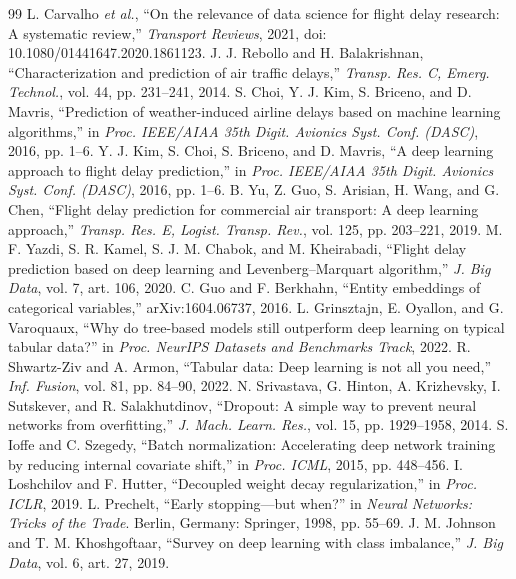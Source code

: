 \documentclass[conference]{IEEEtran}
\begin{document}
\begin{thebibliography}{99}
 L. Carvalho \emph{et al.}, ``On the relevance of data science for flight delay research: A systematic review,'' \emph{Transport Reviews}, 2021, doi: 10.1080/01441647.2020.1861123.
 J. J. Rebollo and H. Balakrishnan, ``Characterization and prediction of air traffic delays,'' \emph{Transp. Res. C, Emerg. Technol.}, vol. 44, pp. 231--241, 2014.
 S. Choi, Y. J. Kim, S. Briceno, and D. Mavris, ``Prediction of weather-induced airline delays based on machine learning algorithms,'' in \emph{Proc. IEEE/AIAA 35th Digit. Avionics Syst. Conf. (DASC)}, 2016, pp. 1--6.
 Y. J. Kim, S. Choi, S. Briceno, and D. Mavris, ``A deep learning approach to flight delay prediction,'' in \emph{Proc. IEEE/AIAA 35th Digit. Avionics Syst. Conf. (DASC)}, 2016, pp. 1--6.
 B. Yu, Z. Guo, S. Arisian, H. Wang, and G. Chen, ``Flight delay prediction for commercial air transport: A deep learning approach,'' \emph{Transp. Res. E, Logist. Transp. Rev.}, vol. 125, pp. 203--221, 2019.
 M. F. Yazdi, S. R. Kamel, S. J. M. Chabok, and M. Kheirabadi, ``Flight delay prediction based on deep learning and Levenberg--Marquart algorithm,'' \emph{J. Big Data}, vol. 7, art. 106, 2020.
 C. Guo and F. Berkhahn, ``Entity embeddings of categorical variables,'' arXiv:1604.06737, 2016.
 L. Grinsztajn, E. Oyallon, and G. Varoquaux, ``Why do tree-based models still outperform deep learning on typical tabular data?'' in \emph{Proc. NeurIPS Datasets and Benchmarks Track}, 2022.
 R. Shwartz-Ziv and A. Armon, ``Tabular data: Deep learning is not all you need,'' \emph{Inf. Fusion}, vol. 81, pp. 84--90, 2022.
 N. Srivastava, G. Hinton, A. Krizhevsky, I. Sutskever, and R. Salakhutdinov, ``Dropout: A simple way to prevent neural networks from overfitting,'' \emph{J. Mach. Learn. Res.}, vol. 15, pp. 1929--1958, 2014.
 S. Ioffe and C. Szegedy, ``Batch normalization: Accelerating deep network training by reducing internal covariate shift,'' in \emph{Proc. ICML}, 2015, pp. 448--456.
 I. Loshchilov and F. Hutter, ``Decoupled weight decay regularization,'' in \emph{Proc. ICLR}, 2019.
 L. Prechelt, ``Early stopping---but when?'' in \emph{Neural Networks: Tricks of the Trade}. Berlin, Germany: Springer, 1998, pp. 55--69.
 J. M. Johnson and T. M. Khoshgoftaar, ``Survey on deep learning with class imbalance,'' \emph{J. Big Data}, vol. 6, art. 27, 2019.

\end{thebibliography}
\end{document}
